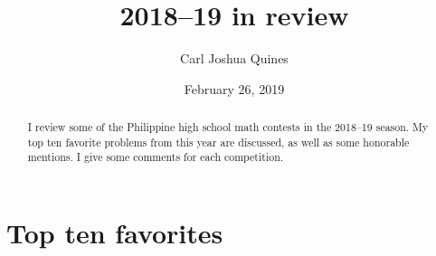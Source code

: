 \documentclass[11pt,paper=letter]{scrartcl}
\begin{document}
\title{2018--19 in review}
\author{Carl Joshua Quines}
\date{February 26, 2019}
\maketitle

\begin{abstract}
  I review some of the Philippine high school math contests in the 2018--19 season. My top ten favorite problems from this year are discussed, as well as some honorable mentions. I give some comments for each competition.
\end{abstract}

\section{Top ten favorites}
\end{document}
